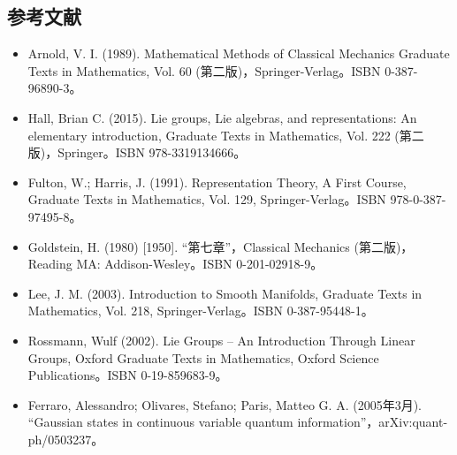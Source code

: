 \subsection{参考文献}
\begin{itemize}
\item Arnold, V. I. (1989). Mathematical Methods of Classical Mechanics Graduate Texts in Mathematics, Vol. 60 (第二版)，Springer-Verlag。ISBN 0-387-96890-3。
\item Hall, Brian C. (2015). Lie groups, Lie algebras, and representations: An elementary introduction, Graduate Texts in Mathematics, Vol. 222 (第二版)，Springer。ISBN 978-3319134666。
\item Fulton, W.; Harris, J. (1991). Representation Theory, A First Course, Graduate Texts in Mathematics, Vol. 129, Springer-Verlag。ISBN 978-0-387-97495-8。
\item Goldstein, H. (1980) [1950]. “第七章”，Classical Mechanics (第二版)，Reading MA: Addison-Wesley。ISBN 0-201-02918-9。
\item Lee, J. M. (2003). Introduction to Smooth Manifolds, Graduate Texts in Mathematics, Vol. 218, Springer-Verlag。ISBN 0-387-95448-1。
\item Rossmann, Wulf (2002). Lie Groups – An Introduction Through Linear Groups, Oxford Graduate Texts in Mathematics, Oxford Science Publications。ISBN 0-19-859683-9。
\item Ferraro, Alessandro; Olivares, Stefano; Paris, Matteo G. A. (2005年3月). “Gaussian states in continuous variable quantum information”，arXiv:quant-ph/0503237。
\end{itemize}
